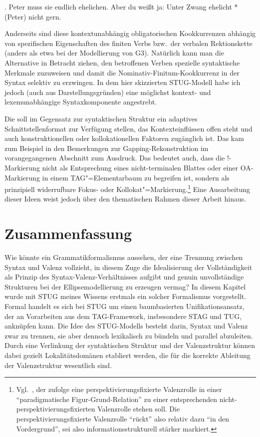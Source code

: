 {\ex. Peter muss sie endlich ehelichen. Aber du wei\ss t ja: Unter Zwang ehelicht *(Peter) nicht gern.

Anderseits sind diese kontextunabhängig obligatorischen Kookkurrenzen abhängig von spezifischen Eigenschaften des finiten Verbs bzw.\ der verbalen Rektionskette (anders als etwa bei der Modellierung von G3). Natürlich kann man die Alternative in Betracht ziehen, den betroffenen Verben spezielle syntaktische Merkmale zuzuweisen und damit die Nominativ-Finitum-Kookkurrenz in der Syntax selektiv zu erzwingen. In dem hier skizzierten STUG-Modell habe ich jedoch (auch aus Darstellungsgründen) eine möglichst kontext- und lexemunabhängige Syntaxkomponente angestrebt. 

Die  soll im Gegensatz zur syntaktischen Struktur ein adaptives Schnittstellenformat zur Verfügung stellen, das Kontexteinflüssen offen steht und auch konstruktionellen oder kollokationellen Faktoren zugänglich ist. Das kam zum Beispiel in den Bemerkungen zur Gapping-Rekonstruktion im vorangegangenen Abschnitt zum Ausdruck. Das bedeutet auch, dass die !-Markierung nicht als Entsprechung eines nicht-terminalen Blattes oder einer OA-Markierung in einem TAG"=Elementarbaum zu begreifen ist, sondern als prinzipiell widerrufbare Fokus- oder Kollokat"=Markierung.\footnote{Vgl.\ \citet[265]{Duerscheid:99}, der zufolge eine perspektivierungsfixierte Valenzrolle in einer "`paradigmatische Figur-Grund-Relation"' zu einer entsprechenden nicht-perspektivierungsfixierten Valenzrolle stehen soll. Die perspektivierungsfixierte Valenzrolle "`rückt"' also relativ dazu "`in den Vordergrund"', sei also informationsstrukturell stärker markiert.} Eine Ausarbeitung dieser Ideen weist jedoch über den thematischen Rahmen dieser Arbeit hinaus.




\section{Zusammenfassung}

Wie könnte ein Grammatikformalismus aussehen, der eine Trennung zwischen Syntax und Valenz vollzieht, in diesem Zuge die Idealisierung der Vollständigkeit als Prinzip des Syntax-Valenz-Verhältnisses aufgibt und genuin unvollständige Strukturen bei der Ellipsemodellierung zu erzeugen vermag? In diesem Kapitel wurde mit STUG meines Wissens erstmals ein solcher Formalismus vorgestellt. Formal handelt es sich bei STUG um einen baumbasierten Unifikationsansatz, der an Vorarbeiten aus dem TAG-Framework, insbesondere STAG und TUG, anknüpfen kann. Die Idee des STUG-Modells besteht darin, Syntax und Valenz zwar zu trennen, sie aber dennoch lexikalisch zu bündeln und parallel abzuleiten. Durch eine Verlinkung der syntaktischen Struktur und der Valenzstruktur können dabei gezielt Lokalitätsdomänen etabliert werden, die für die korrekte Ableitung der Valenzstruktur wesentlich sind.  

}
